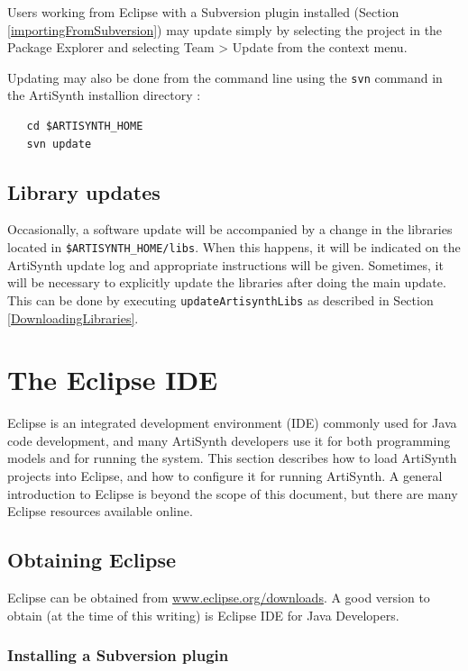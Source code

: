 \documentclass{article}
\def\SEP{/}
\def\directory{directory }
\begin{document}
Users working from Eclipse with a Subversion plugin installed
(Section \ref{importingFromSubversion}) may update simply by selecting
the project in the {\sf Package Explorer} and selecting {\sf Team >
Update} from the context menu.

Updating may also be done from the command line using the {\tt svn}
command in the ArtiSynth installion \directory:
\begin{verbatim}
   cd $ARTISYNTH_HOME
   svn update 
\end{verbatim}

\subsection{Library updates}

Occasionally, a software update will be accompanied by a change in the
libraries located in {\tt \$ARTISYNTH\_HOME\SEP libs}.  When this
happens, it will be indicated on the ArtiSynth update log and
appropriate instructions will be given. Sometimes, it will be
necessary to explicitly update the libraries after doing the main
update. This can be done by executing {\tt updateArtisynthLibs} as
described in Section \ref{DownloadingLibraries}.

\section{The Eclipse IDE}
\label{EclipseIDE}

Eclipse is an integrated development environment (IDE) commonly used
for Java code development, and many ArtiSynth developers use it for
both programming models and for running the system. This section
describes how to load ArtiSynth projects into Eclipse, and how to
configure it for running ArtiSynth. A general introduction to Eclipse
is beyond the scope of this document, but there are many Eclipse
resources available online.

\subsection{Obtaining Eclipse}

Eclipse can be obtained from
\href{http://www.eclipse.org/downloads}{www.eclipse.org/downloads}.  A
good version to obtain (at the time of this writing) is {\sf Eclipse
IDE for Java Developers}.

\subsubsection{Installing a Subversion plugin}
\end{document}
